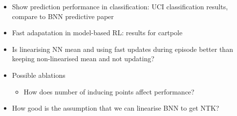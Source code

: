 \documentclass{article}
\begin{document}

\begin{itemize}
  \item Show prediction performance in classification: UCI classification results, compare to BNN predictive paper
  \item Fast adapatation in model-based RL: results for cartpole
  \item Is linearising NN mean and using fast updates during episode better than keeping non-linearised mean and not updating?
  \item Possible ablations
  \begin{itemize}
    \item How does number of inducing points affect performance?
  \end{itemize}
  \item How good is the assumption that we can linearise BNN to get NTK?
\end{itemize}
\end{document}
